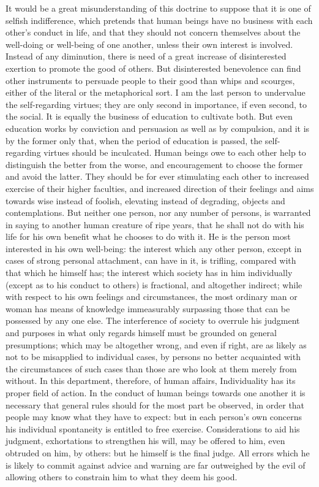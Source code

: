 \documentclass[11pt,openany]{book}
\begin{document}
It would be a great misunderstanding of this doctrine to suppose that it is one of selfish indifference, which pretends that human beings have no business with each other's conduct in life, and that they should not concern themselves about the well-doing or well-being of one another, unless their own interest is involved. Instead of any diminution, there is need of a great increase of disinterested exertion to promote the good of others. But disinterested benevolence can find other instruments to persuade people to their good than whips and scourges, either of the literal or the metaphorical sort. I am the last person to undervalue the self-regarding virtues; they are only second in importance, if even second, to the social. It is equally the business of education to cultivate both. But even education works by conviction and persuasion as well as by compulsion, and it is by the former only that, when the period of education is passed, the self-regarding virtues should be inculcated. Human beings owe to each other help to distinguish the better from the worse, and encouragement to choose the former and avoid the latter. They should be for ever stimulating each other to increased exercise of their higher faculties, and increased direction of their feelings and aims towards wise instead of foolish, elevating instead of degrading, objects and contemplations. But neither one person, nor any number of persons, is warranted in saying to another human creature of ripe years, that he shall not do with his life for his own benefit what he chooses to do with it. He is the person most interested in his own well-being: the interest which any other person, except in cases of strong personal attachment, can have in it, is trifling, compared with that which he himself has; the interest which society has in him individually (except as to his conduct to others) is fractional, and altogether indirect; while with respect to his own feelings and circumstances, the most ordinary man or woman has means of knowledge immeasurably surpassing those that can be possessed by any one else. The interference of society to overrule his judgment and purposes in what only regards himself must be grounded on general presumptions; which may be altogether wrong, and even if right, are as likely as not to be misapplied to individual cases, by persons no better acquainted with the circumstances of such cases than those are who look at them merely from without. In this department, therefore, of human affairs, Individuality has its proper field of action. In the conduct of human beings towards one another it is necessary that general rules should for the most part be observed, in order that people may know what they have to expect: but in each person's own concerns his individual spontaneity is entitled to free exercise. Considerations to aid his judgment, exhortations to strengthen his will, may be offered to him, even obtruded on him, by others: but he himself is the final judge. All errors which he is likely to commit against advice and warning are far outweighed by the evil of allowing others to constrain him to what they deem his good.
\end{document}
